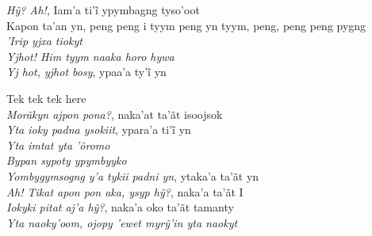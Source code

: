   \textit{Hỹ? Ah!}, Iam’a ti’ĩ ypymbagng tyso’oot\\
  Kapon ta'an yn, peng peng i tyym peng yn tyym, peng, peng peng pygng\\
  \textit{'Irip yjxa tiokyt}\\
  \textit{Yjhot! Him tyym naaka horo hywa}\\
  \textit{Yj hot, yjhot bosy}, ypaa’a ty’ĩ yn

\smallskip
 \begin{center}\end{center}
 \smallskip

\noindent   Tek tek tek here\\
  \textit{Morãkyn ajpon pona?}, naka'at ta'ãt isoojsok\\
  \textit{Yta ioky padna ysokiit}, ypara’a ti’ĩ yn\\
  \textit{Yta imtat yta 'õromo}\\
  \textit{Bypan sypoty ypymbyyko}\\
  \textit{Yombygymsogng y'a tykii padni yn}, ytaka'a ta'ãt yn\\
  \textit{Ah! Tikat apon pon aka, ysyp hỹ?}, naka’a ta’ãt I\\
  \textit{Iokyki pitat aj’a hỹ?}, naka’a oko ta’ãt tamanty\\
  \textit{Yta naoky’oom, ojopy ’ewet myrỹ’in yta naokyt}

\smallskip
 \begin{center}\end{center}
 \smallskip

